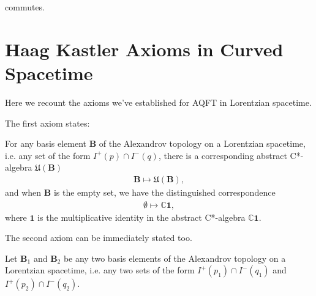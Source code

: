 \begin{definition}
\begin{axiom}
    \begin{center}
    \end{center}

    commutes.
\end{axiom}


\section{Haag Kastler Axioms in Curved Spacetime}\label{sctn:haag-kastler-axioms-in-curved-spacetime}
Here we recount the axioms we've established for AQFT in Lorentzian spacetime.

The first axiom states:

\begin{definition}
    \label{def:local-algebras-in-curved-spacetime}
    For any basis element $\mathbf{B}$ of the Alexandrov topology on a Lorentzian spacetime, i.e. any set of the form $I^+(p) \cap I^-(q)$, there is a corresponding abstract C*-algebra $\mathfrak{U}(\mathbf{B})$
    \begin{align}
        \mathbf{B} \longmapsto \mathfrak{U}(\mathbf{B}),
    \end{align}
    and when $\mathbf{B}$ is the empty set, we have the distinguished correspondence
    \begin{align}
        \emptyset \longmapsto \mathbb{C} \mathbf{1},
    \end{align}
    where $\mathbf{1}$ is the multiplicative identity in the abstract C*-algebra $\mathbb{C} \mathbf{1}$.
\end{definition}

The second axiom can be immediately stated too.

\begin{definition}
    \label{def:isotony-in-curved-spacetime}
    Let $\mathbf{B}_1$ and $\mathbf{B}_2$ be any two basis elements of the Alexandrov topology on a Lorentzian spacetime, i.e. any two sets of the form $I^+(p_1) \cap I^-(q_1)$ and $I^+(p_2) \cap I^-(q_2)$.
    

\end{definition}
\end{definition}
